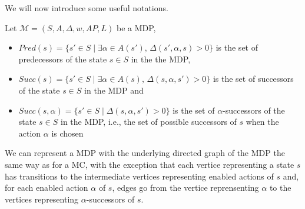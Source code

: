 We will now introduce some useful notations.

\begin{notation}
  Let $\mathcal{M}=(S, A, \Delta, w, AP, L)$ be a MDP,
  \begin{itemize}
    \item $Pred(s) = \{ s' \in S \; | \; \exists \alpha \in A(s'), \, \Delta(s', \alpha, s) > 0 \}$ is the set of predecessors of the state $s \in S$ in the the MDP,
    \item $Succ(s) = \{ s' \in S \; | \; \exists \alpha \in A(s), \, \Delta(s, \alpha, s') > 0 \}$ is the set of successors of the state $s \in S$ in the MDP and
    \item $Succ(s, \alpha) = \{ s' \in S \; | \; \Delta(s, \alpha, s') > 0 \}$
      is the set of $\alpha$-successors of the state $s \in S$ in the MDP, i.e., the set of possible successors of $s$ when the action $\alpha$ is chosen
  \end{itemize}
\end{notation}

We can represent a MDP with the underlying directed graph of the MDP the same way as for a MC, with the exception that each vertice representing a state $s$ has transitions to the intermediate vertices representing enabled actions of $s$ and, for each enabled action $\alpha$ of $s$, edges go from the vertice reprensenting $\alpha$ to the vertices representing $\alpha$-successors of $s$.

